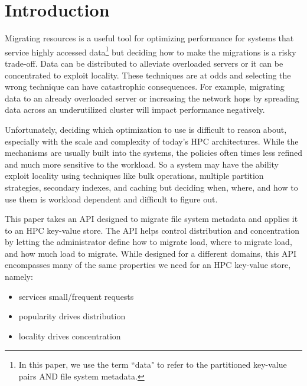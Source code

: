 \section{Introduction}

Migrating resources is a useful tool for optimizing performance for systems
that service highly accessed data\footnote{In this paper, we use the term
``data" to refer to the partitioned key-value pairs AND file system metadata.}
but deciding how to make the migrations is a risky trade-off. Data can be
distributed to alleviate overloaded servers or it can be concentrated to
exploit locality. These techniques are at odds and selecting the wrong technique
can have catastrophic consequences. For example, migrating data to an
already overloaded server or increasing the network hops by spreading data
across an underutilized cluster will impact performance negatively.

Unfortunately, deciding which optimization to use is difficult to reason about,
especially with the scale and complexity of today's HPC architectures. While
the mechanisms are usually built into the systems, the policies often times
less refined and much more sensitive to the workload. So a system may have the
ability exploit locality using techniques like bulk operations, multiple
partition strategies, secondary indexes, and caching but deciding when, where,
and how to use them is workload dependent and difficult to figure out.

This paper takes an API designed to migrate file system metadata and applies it
to an HPC key-value store.  The API helps control distribution and
concentration by letting the administrator define how to migrate load, where to
migrate load, and how much load to migrate. While designed for a different
domains, this API encompasses many of the same properties we need for an HPC
key-value store, namely:

\begin{itemize}
  \item services small/frequent requests
  \item popularity drives distribution
  \item locality drives concentration
\end{itemize}


